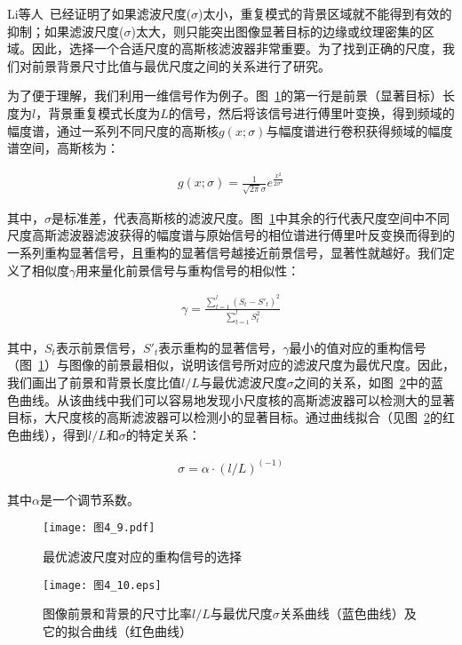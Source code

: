 Li等人~\cite{LiJianTPAMI2013Scale}已经证明了如果滤波尺度($\sigma$)太小，重复模式的背景区域就不能得到有效的抑制；如果滤波尺度($\sigma$)太大，则只能突出图像显著目标的边缘或纹理密集的区域。因此，选择一个合适尺度的高斯核滤波器非常重要。为了找到正确的尺度，我们对前景背景尺寸比值与最优尺度之间的关系进行了研究。

为了便于理解，我们利用一维信号作为例子。图~\ref{图4_9}的第一行是前景（显著目标）长度为$l$，背景重复模式长度为$L$的信号，然后将该信号进行傅里叶变换，得到频域的幅度谱，通过一系列不同尺度的高斯核$g(x;\sigma)$与幅度谱进行卷积获得频域的幅度谱空间，高斯核为：
\begin{linenomath}
\begin{align}
g(x;\sigma)=\frac{1}{\sqrt{2\pi}\sigma}e^{\frac{x^{2}}{2\sigma^{2}}}
\label{式4_5}
\end{align}
\end{linenomath}
其中，$\sigma$是标准差，代表高斯核的滤波尺度。图~\ref{图4_9}中其余的行代表尺度空间中不同尺度高斯滤波器滤波获得的幅度谱与原始信号的相位谱进行傅里叶反变换而得到的一系列重构显著信号，且重构的显著信号越接近前景信号，显著性就越好。我们定义了相似度$\gamma$用来量化前景信号与重构信号的相似性：
\begin{linenomath}
\begin{align}
\gamma=\frac{\sum_{t=1}^{l}(S_{t}-S'_{t})^{2}}{\sum_{t=1}^{l}S_{t}^{2}}
\label{式4_6}
\end{align}
\end{linenomath}
其中，$S_{t}$表示前景信号，$S'_{t}$表示重构的显著信号，$\gamma$最小的值对应的重构信号（图~\ref{图4_9}）与图像的前景最相似，说明该信号所对应的滤波尺度为最优尺度。因此，我们画出了前景和背景长度比值$l/L$与最优滤波尺度$\sigma$之间的关系，如图~\ref{图4_10}中的蓝色曲线。从该曲线中我们可以容易地发现小尺度核的高斯滤波器可以检测大的显著目标，大尺度核的高斯滤波器可以检测小的显著目标。通过曲线拟合（见图~\ref{图4_10}的红色曲线），得到$l/L$和$\sigma$的特定关系：
\begin{linenomath}
\begin{align}
\sigma=\alpha\cdot(l/L)^{(-1)}
\label{式4_7}
\end{align}
\end{linenomath}
其中$\alpha$是一个调节系数。
\begin{figure}[h]
  \centering
  \texttt{[image: 图4\_9.pdf]}
  \caption{最优滤波尺度对应的重构信号的选择}   
  \label{图4_9} 
\end{figure}
\begin{figure}[h]
  \centering
  \texttt{[image: 图4\_10.eps]}
  \caption{图像前景和背景的尺寸比率$l/L$与最优尺度$\sigma$关系曲线（蓝色曲线）及它的拟合曲线（红色曲线）}   
  \label{图4_10} 
\end{figure}

